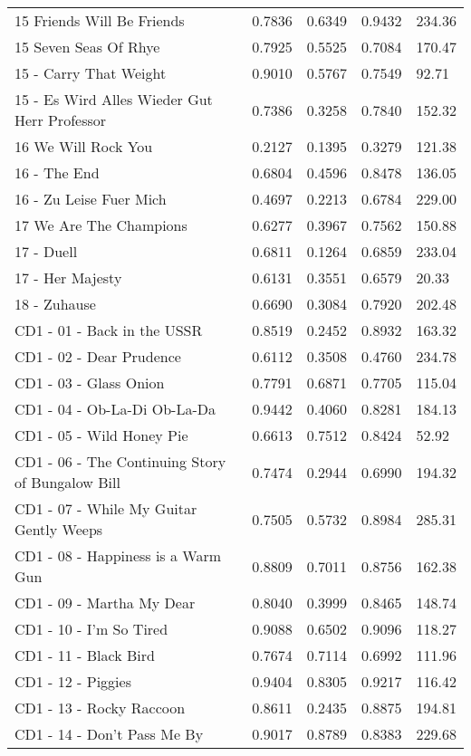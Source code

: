 \begin{longtable}[c]{|p{8cm}|c|l|l|l|}
15 Friends Will Be Friends & 0.7836 & 0.6349 & 0.9432 & 234.36 \\
15 Seven Seas Of Rhye & 0.7925 & 0.5525 & 0.7084 & 170.47 \\
15 - Carry That Weight & 0.9010 & 0.5767 & 0.7549 & 92.71 \\
15 - Es Wird Alles Wieder Gut  Herr Professor & 0.7386 & 0.3258 & 0.7840 & 152.32 \\
16 We Will Rock You & 0.2127 & 0.1395 & 0.3279 & 121.38 \\
16 - The End & 0.6804 & 0.4596 & 0.8478 & 136.05 \\
16 - Zu Leise Fuer Mich & 0.4697 & 0.2213 & 0.6784 & 229.00 \\
17 We Are The Champions & 0.6277 & 0.3967 & 0.7562 & 150.88 \\
17 - Duell & 0.6811 & 0.1264 & 0.6859 & 233.04 \\
17 - Her Majesty & 0.6131 & 0.3551 & 0.6579 & 20.33 \\
18 - Zuhause & 0.6690 & 0.3084 & 0.7920 & 202.48 \\
CD1 - 01 - Back in the USSR & 0.8519 & 0.2452 & 0.8932 & 163.32 \\
CD1 - 02 - Dear Prudence & 0.6112 & 0.3508 & 0.4760 & 234.78 \\
CD1 - 03 - Glass Onion & 0.7791 & 0.6871 & 0.7705 & 115.04 \\
CD1 - 04 - Ob-La-Di  Ob-La-Da & 0.9442 & 0.4060 & 0.8281 & 184.13 \\
CD1 - 05 - Wild Honey Pie & 0.6613 & 0.7512 & 0.8424 & 52.92 \\
CD1 - 06 - The Continuing Story of Bungalow Bill & 0.7474 & 0.2944 & 0.6990 & 194.32 \\
CD1 - 07 - While My Guitar Gently Weeps & 0.7505 & 0.5732 & 0.8984 & 285.31 \\
CD1 - 08 - Happiness is a Warm Gun & 0.8809 & 0.7011 & 0.8756 & 162.38 \\
CD1 - 09 - Martha My Dear & 0.8040 & 0.3999 & 0.8465 & 148.74 \\
CD1 - 10 - I'm So Tired & 0.9088 & 0.6502 & 0.9096 & 118.27 \\
CD1 - 11 - Black Bird & 0.7674 & 0.7114 & 0.6992 & 111.96 \\
CD1 - 12 - Piggies & 0.9404 & 0.8305 & 0.9217 & 116.42 \\
CD1 - 13 - Rocky Raccoon & 0.8611 & 0.2435 & 0.8875 & 194.81 \\
CD1 - 14 - Don't Pass Me By & 0.9017 & 0.8789 & 0.8383 & 229.68 \\

\end{longtable}
